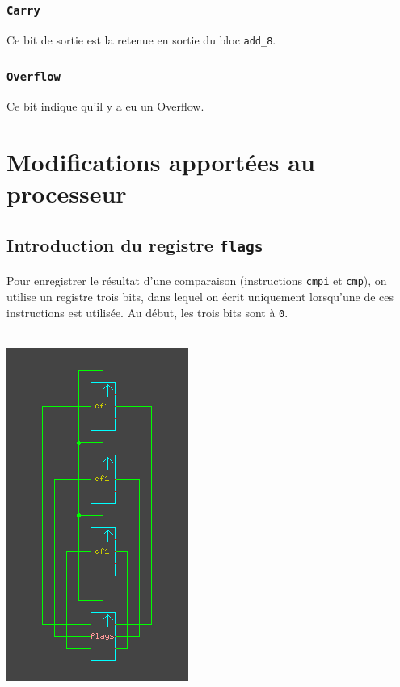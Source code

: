 \documentclass[11pt, a4paper, twoside, titlepage]{article}
\begin{document}
\subsubsection{\texttt{Carry}}
Ce bit de sortie est la retenue en sortie du bloc \texttt{add\_8}.

\subsubsection{\texttt{Overflow}}
Ce bit indique qu'il y a eu un Overflow.

\section{Modifications apportées au processeur}

\subsection{Introduction du registre \texttt{flags}}
\paragraph{}
Pour enregistrer le résultat d'une comparaison (instructions \texttt{cmpi} et \texttt{cmp}), on utilise un registre trois bits, dans lequel on écrit uniquement lorsqu'une de ces instructions est utilisée. Au début, les trois bits sont à \texttt{0}.\\
\\
\centerline{\includegraphics[scale=.8]{flags}}
\end{document}

